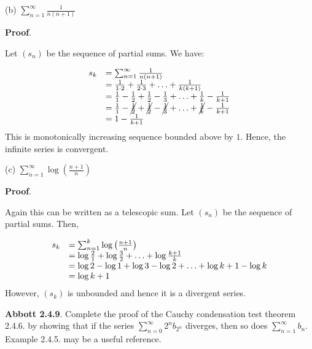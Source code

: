 \documentclass[10pt]{article}
\begin{document}
(b) $\displaystyle \sum _{n=1}^{\infty }\frac{1}{n( n+1)}$



\textbf{Proof}.



Let $\displaystyle ( s_{n})$ be the sequence of partial sums. We have:




\begin{equation*}
\begin{array}{ c l }
s_{k} & =\sum _{n=1}^{\infty }\frac{1}{n( n+1)}\\
 & =\frac{1}{1\cdot 2} +\frac{1}{2\cdot 3} +\dotsc +\frac{1}{k( k+1)}\\
 & =\frac{1}{1} -\frac{1}{2} +\frac{1}{2} -\frac{1}{3} +\dotsc +\frac{1}{k} -\frac{1}{k+1}\\
 & =\frac{1}{1} -\cancel{\frac{1}{2}} +\cancel{\frac{1}{2}} -\cancel{\frac{1}{3}} +\dotsc +\cancel{\frac{1}{k}} -\frac{1}{k+1}\\
 & =1-\frac{1}{k+1}
\end{array}
\end{equation*}
This is monotonically increasing sequence bounded above by $\displaystyle 1$. Hence, the infinite series is convergent.



(c) $\displaystyle \sum _{n=1}^{\infty }\log\left(\frac{n+1}{n}\right)$



\textbf{Proof}.



Again this can be written as a telescopic sum. Let $\displaystyle ( s_{n})$ be the sequence of partial sums. Then,


\begin{equation*}
\begin{array}{ c l }
s_{k} & =\sum _{n=1}^{k}\log\left(\frac{n+1}{n}\right)\\
 & =\log\frac{2}{1} +\log\frac{3}{2} +\dotsc +\log\frac{k+1}{k}\\
 & =\log 2-\log 1+\log 3-\log 2+\dotsc +\log k+1-\log k\\
 & =\log k+1
\end{array}
\end{equation*}
However, $\displaystyle ( s_{k})$ is unbounded and hence it is a divergent series.



\textbf{Abbott 2.4.9}. Complete the proof of the Cauchy condensation test theorem 2.4.6. by showing that if the series $\displaystyle \sum _{n=0}^{\infty } 2^{n} b_{2^{n}}$ diverges, then so does $\displaystyle \sum _{n=1}^{\infty } b_{n}$. Example 2.4.5. may be a useful reference.
\end{document}
